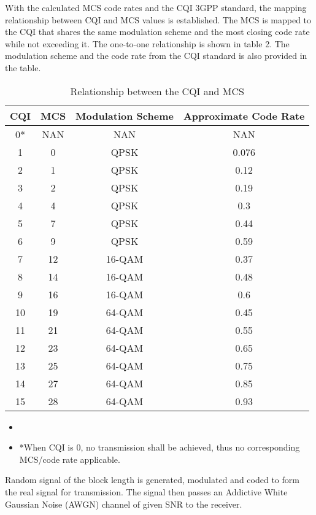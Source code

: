 \documentclass[journal,comsoc]{IEEEtran}
\begin{document}
With the calculated MCS code rates and the CQI 3GPP standard, the mapping relationship between CQI and MCS values is established. The MCS is mapped to the CQI that shares the same modulation scheme and the most closing code rate while not exceeding it. The one-to-one relationship is shown in table 2. The modulation scheme and the code rate from the CQI standard is also provided in the table.
\begin{table}[!h]
\centering
\caption{Relationship between the CQI and MCS}
\label{my-label}
\begin{tabular}{ cccc }
\hline
  CQI & MCS & Modulation Scheme & Approximate Code Rate \\ \hline
  0* & NAN & NAN & NAN \\ \hline
  1 & 0 & QPSK & 0.076 \\ \hline
  2 & 1 & QPSK & 0.12 \\ \hline
  3 & 2 & QPSK & 0.19 \\ \hline
  4 & 4 & QPSK & 0.3 \\ \hline
  5 & 7 & QPSK & 0.44 \\ \hline
  6 & 9 & QPSK & 0.59 \\ \hline
  7 & 12 & 16-QAM & 0.37 \\ \hline
  8 & 14 & 16-QAM & 0.48 \\ \hline
  9 & 16 & 16-QAM & 0.6 \\ \hline
  10 & 19 & 64-QAM & 0.45 \\ \hline
  11 & 21 & 64-QAM & 0.55 \\ \hline
  12 & 23 & 64-QAM & 0.65 \\ \hline
  13 & 25 & 64-QAM & 0.75 \\ \hline
  14 & 27 & 64-QAM & 0.85 \\ \hline
  15 & 28 & 64-QAM & 0.93 \\ \hline
\end{tabular}
\begin{itemize}
  \item
  \item *When CQI is 0, no transmission shall be achieved, thus no corresponding MCS/code rate applicable.
\end{itemize}
\end{table}





Random signal of the block length is generated, modulated and coded to form the real signal for transmission. The signal then passes an Addictive White Gaussian Noise (AWGN) channel of given SNR to the receiver.
\end{document}
